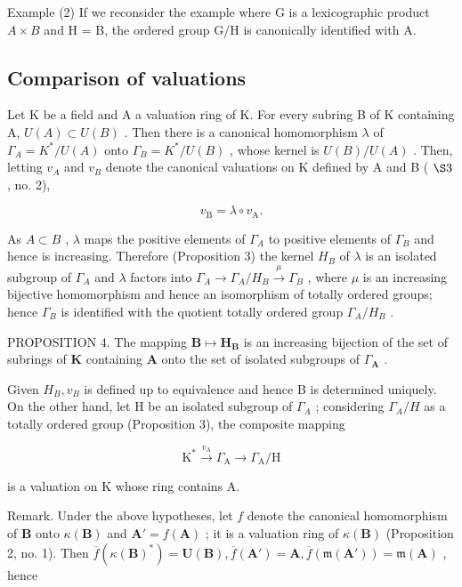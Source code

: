 Example (2) If we reconsider the example where G is a lexicographic product \(A \times B\) and H = B, the ordered group G/H is canonically identified with A.

\subsection{Comparison of valuations}

Let K be a field and A a valuation ring of K. For every subring B of K containing A, \(U(A) \subset U(B)\) . Then there is a canonical homomorphism \(\lambda\) of \(\Gamma_{A} = K^{*}/U(A)\) onto \(\Gamma_{B} = K^{*}/U(B)\) , whose kernel is \(U(B)/U(A)\) . Then, letting \(v_{A}\) and \(v_{B}\) denote the canonical valuations on K defined by A and B ( \(\S 3\) , no. 2),

\[
v _ {\mathrm{B}} = \lambda \circ v _ {\mathrm{A}}.\tag{1}
\]

As \(A \subset B\) , \(\lambda\) maps the positive elements of \(\Gamma_{A}\) to positive elements of \(\Gamma_{B}\) and hence is increasing. Therefore (Proposition 3) the kernel \(H_{B}\) of \(\lambda\) is an isolated subgroup of \(\Gamma_{A}\) and \(\lambda\) factors into \(\Gamma_{A} \to \Gamma_{A}/H_{B} \xrightarrow{\mu} \Gamma_{B}\) , where \(\mu\) is an increasing bijective homomorphism and hence an isomorphism of totally ordered groups; hence \(\Gamma_{B}\) is identified with the quotient totally ordered group \(\Gamma_{A}/H_{B}\) .

PROPOSITION 4. The mapping \(\mathbf{B} \mapsto \mathbf{H}_{\mathbf{B}}\) is an increasing bijection of the set of subrings of \(\mathbf{K}\) containing \(\mathbf{A}\) onto the set of isolated subgroups of \(\Gamma_{\mathbf{A}}\) .

Given \(H_{B}, v_{B}\) is defined up to equivalence and hence B is determined uniquely. On the other hand, let H be an isolated subgroup of \(\Gamma_{A}\) ; considering \(\Gamma_{A}/H\) as a totally ordered group (Proposition 3), the composite mapping

\[
\mathrm{K} ^ {*} \xrightarrow {v _ {\mathrm{A}}} \Gamma_ {\mathrm{A}} \longrightarrow \Gamma_ {\mathrm{A}} / \mathrm{H}
\]

is a valuation on K whose ring contains A.

Remark. Under the above hypotheses, let \(f\) denote the canonical homomorphism of \(\mathbf{B}\) onto \(\kappa(\mathbf{B})\) and \(\mathbf{A}' = f(\mathbf{A})\) ; it is a valuation ring of \(\kappa(\mathbf{B})\) (Proposition 2, no. 1). Then \(\overline{f}(\kappa(\mathbf{B})^*) = \mathbf{U}(\mathbf{B}), \overline{f}(\mathbf{A}') = \mathbf{A}, \overline{f}(\mathfrak{m}(\mathbf{A}')) = \mathfrak{m}(\mathbf{A})\) , hence

